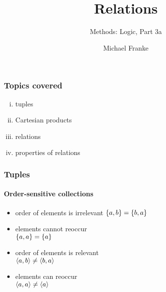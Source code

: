 \documentclass[fleqn,10pt,serif,xcolor=svgnames,xcolor=table,aspectratio=169]{beamer}
\title{Relations}
\subtitle{Methods: Logic, Part 3a}
\author{Michael Franke}
\date{}
\begin{document}

\abovedisplayskip=3pt
\abovedisplayshortskip=3pt

\belowdisplayskip=3pt
\belowdisplayshortskip=3pt

\begin{frame}
  \maketitle
\end{frame}

\begin{frame}
  \frametitle{Topics covered}

  \begin{enumerate}[(i)]
    \item tuples
    \item Cartesian products
    \item relations
    \item properties of relations
  \end{enumerate}

\end{frame}

\begin{frame}
  \frametitle{Tuples}
  \framesubtitle{Order-sensitive collections}

\begin{minipage}{0.45\linewidth}
    \textbf{\color{themecolor}{Sets}}
    \begin{itemize}
      \item order of elements is irrelevant
      $ \left\{a,b\right\} = \left\{b,a\right\}$
      \item elements cannot reoccur \\
      $\left\{a,a\right\} = \left\{a\right\}$
    \end{itemize}
  \end{minipage}
  \hfill
  \begin{minipage}{0.45\linewidth}
    \textbf{\color{themecolor}{Tuples}}
    \begin{itemize}
      \item order of elements is relevant \\
      $ \left \langle a,b\right\rangle \neq \left \langle b,a\right\rangle$
      \item elements can reoccur \\
      $\left \langle a,a\right\rangle \neq \left \langle a\right\rangle$
    \end{itemize}
  \end{minipage}

\end{frame}
\end{document}
